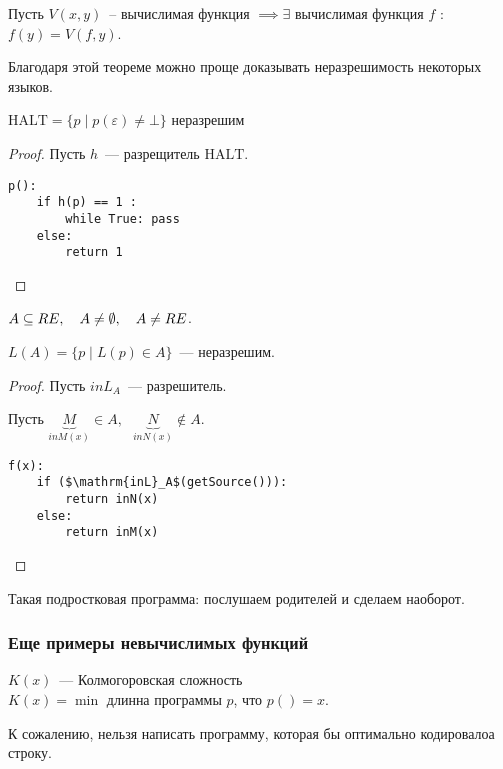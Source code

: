 \begin{theorem}[О рекурсии]
    Пусть $V(x, y)$~-- вычислимая функция $\implies \exists $ вычислимая  функция $f$ :  $f(y) =  V (f, y)$.
\end{theorem}

Благодаря этой теореме можно проще доказывать неразрешимость некоторых языков.

\begin{example}
    $\mathrm{HALT} = \{ p \mid p(\varepsilon) \neq \bot \}$ неразрешим

    \begin{proof}
        Пусть $h$~--- разрещитель $\mathrm{HALT}$.

\begin{lstlisting}[mathescape=true]
p():
    if h(p) == 1 :
        while True: pass
    else:
        return 1
\end{lstlisting}
    \end{proof}
\end{example}


\begin{example}
    $A \subseteq RE, ~~~A \neq \emptyset,~~~ A \neq RE$.

    $L(A )  = \{ p \mid L(p) \in A \}$~--- неразрешим.

    \begin{proof}
        Пусть $inL_A$~--- разрешитель.

Пусть $\underbrace{M}_{inM(x)}\in A,~~~ \underbrace{N}_{inN(x)} \not\in A$.

\begin{lstlisting}[mathescape=true]
f(x):
    if ($\mathrm{inL}_A$(getSource())):
        return inN(x)
    else:
        return inM(x)

\end{lstlisting}
    \end{proof}
\begin{note}
    Такая подростковая программа: послушаем родителей и сделаем наоборот.
\end{note}
\end{example}

\subsubsection*{Еще примеры невычислимых функций}

\begin{example}
    $K(x)$~--- Колмогоровская сложность\\
    $K(x) = \min$ длинна программы $p$, что $p() = x$.

    К сожалению, нельзя написать программу, которая бы оптимально кодировалоа строку.
\end{example}

